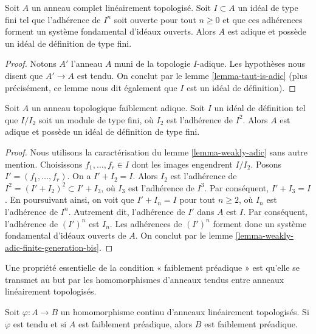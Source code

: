 \begin{lemma}
\label{lemma-weakly-adic-finite-generation-bis}
Soit $A$ un anneau complet linéairement topologisé. Soit $I \subset A$ un idéal
de type fini tel que l'adhérence de $I^n$ soit ouverte pour tout
$n \geq 0$ et que ces adhérences forment un système fondamental d'idéaux ouverts.
Alors $A$ est adique et possède un idéal de définition de type fini.
\end{lemma}

\begin{proof}
Notons $A'$ l'anneau $A$ muni de la topologie $I$-adique.
Les hypothèses nous disent que $A' \to A$ est tendu.
On conclut par le lemme \ref{lemma-taut-is-adic} (plus précisément, ce
lemme nous dit également que $I$ est un idéal de définition).
\end{proof}

\begin{lemma}
\label{lemma-weakly-adic-finite-generation}
Soit $A$ un anneau topologique faiblement adique. Soit $I$ un
idéal de définition tel que $I/I_2$ soit un module de type fini,
où $I_2$ est l'adhérence de $I^2$.
Alors $A$ est adique et possède un idéal de définition de type fini.
\end{lemma}

\begin{proof}
Nous utilisons la caractérisation du lemme \ref{lemma-weakly-adic}
sans autre mention.
Choisissons $f_1, \ldots, f_r \in I$ dont les images engendrent $I/I_2$.
Posons $I' = (f_1, \ldots, f_r)$. On a $I' + I_2 = I$.
Alors $I_2$ est l'adhérence de $I^2 = (I' + I_2)^2 \subset I' + I_3$,
où $I_3$ est l'adhérence de $I^3$. Par conséquent, $I' + I_3 = I$.
En poursuivant ainsi, on voit que $I' + I_n = I$ pour tout $n \geq 2$,
où $I_n$ est l'adhérence de $I^n$.
Autrement dit, l'adhérence de $I'$ dans $A$ est $I$.
Par conséquent, l'adhérence de $(I')^n$ est $I_n$. Les adhérences de $(I')^n$
forment donc un système fondamental d'idéaux ouverts de $A$.
On conclut par le lemme \ref{lemma-weakly-adic-finite-generation-bis}.
\end{proof}

\noindent
Une propriété essentielle de la condition « faiblement préadique » est qu'elle se transmet au but
par les homomorphismes d'anneaux tendus entre anneaux linéairement topologisés.

\begin{lemma}
\label{lemma-taut-ascent-weakly-adic}
Soit $\varphi : A \to B$ un homomorphisme continu d'anneaux
linéairement topologisés. Si $\varphi$ est tendu et si $A$
est faiblement préadique, alors $B$ est faiblement préadique.
\end{lemma}

